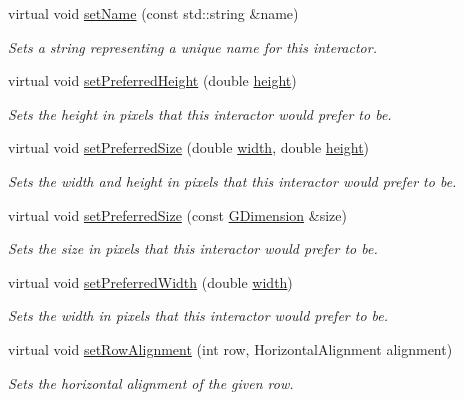 \begin{DoxyCompactItemize}
virtual void \mbox{\hyperlink{classGInteractor_a9d3a2685df23b5e7cbf59c19c4a1f9b5}{set\+Name}} (const std\+::string \&name)
\begin{DoxyCompactList}\small\item\em Sets a string representing a unique name for this interactor. \end{DoxyCompactList}\item 
virtual void \mbox{\hyperlink{classGInteractor_a1ab987704fce32098706c6f00fb08218}{set\+Preferred\+Height}} (double \mbox{\hyperlink{classGTable_ad3774f6419003470f54fd495124ef51f}{height}})
\begin{DoxyCompactList}\small\item\em Sets the height in pixels that this interactor would prefer to be. \end{DoxyCompactList}\item 
virtual void \mbox{\hyperlink{classGInteractor_a042c5ae19430d765ef552371cae3632c}{set\+Preferred\+Size}} (double \mbox{\hyperlink{classGTable_ad72663daf610f2a0833a2fc3d78e4fdf}{width}}, double \mbox{\hyperlink{classGTable_ad3774f6419003470f54fd495124ef51f}{height}})
\begin{DoxyCompactList}\small\item\em Sets the width and height in pixels that this interactor would prefer to be. \end{DoxyCompactList}\item 
virtual void \mbox{\hyperlink{classGInteractor_aa22d9be4bc0e078bb0ea69b0fc9d7c75}{set\+Preferred\+Size}} (const \mbox{\hyperlink{classGDimension}{G\+Dimension}} \&size)
\begin{DoxyCompactList}\small\item\em Sets the size in pixels that this interactor would prefer to be. \end{DoxyCompactList}\item 
virtual void \mbox{\hyperlink{classGInteractor_a3db429ab2fa52efd187eec0ed8cdd9f2}{set\+Preferred\+Width}} (double \mbox{\hyperlink{classGTable_ad72663daf610f2a0833a2fc3d78e4fdf}{width}})
\begin{DoxyCompactList}\small\item\em Sets the width in pixels that this interactor would prefer to be. \end{DoxyCompactList}\item 
virtual void \mbox{\hyperlink{classGTable_ac6a47ba68c502b7d8dc776beeeffccc3}{set\+Row\+Alignment}} (int row, Horizontal\+Alignment alignment)
\begin{DoxyCompactList}\small\item\em Sets the horizontal alignment of the given row. \end{DoxyCompactList}\item 

\end{DoxyCompactItemize}
